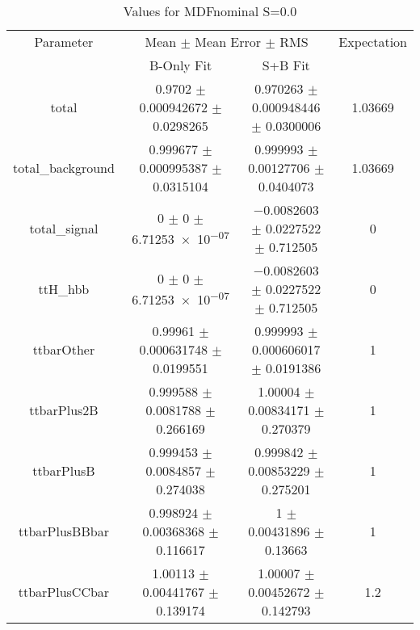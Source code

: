 \begin{table}
\centering
\caption{Values for MDFnominal S=0.0}
\begin{tabular}{cccc}
\toprule
Parameter & \multicolumn{2}{c}{Mean $\pm$ Mean Error $\pm$ RMS} & Expectation\\
 & B-Only Fit & S+B Fit & \\
\midrule
total & \num{0.9702} $\pm$ \num{0.000942672} $\pm$ \num{0.0298265} & \num{0.970263} $\pm$ \num{0.000948446} $\pm$ \num{0.0300006} & \num{1.03669}\\
total\_background & \num{0.999677} $\pm$ \num{0.000995387} $\pm$ \num{0.0315104} & \num{0.999993} $\pm$ \num{0.00127706} $\pm$ \num{0.0404073} & \num{1.03669}\\
total\_signal & \num{0} $\pm$ \num{0} $\pm$ \num{6.71253e-07} & \num{-0.0082603} $\pm$ \num{0.0227522} $\pm$ \num{0.712505} & \num{0}\\
ttH\_hbb & \num{0} $\pm$ \num{0} $\pm$ \num{6.71253e-07} & \num{-0.0082603} $\pm$ \num{0.0227522} $\pm$ \num{0.712505} & \num{0}\\
ttbarOther & \num{0.99961} $\pm$ \num{0.000631748} $\pm$ \num{0.0199551} & \num{0.999993} $\pm$ \num{0.000606017} $\pm$ \num{0.0191386} & \num{1}\\
ttbarPlus2B & \num{0.999588} $\pm$ \num{0.0081788} $\pm$ \num{0.266169} & \num{1.00004} $\pm$ \num{0.00834171} $\pm$ \num{0.270379} & \num{1}\\
ttbarPlusB & \num{0.999453} $\pm$ \num{0.0084857} $\pm$ \num{0.274038} & \num{0.999842} $\pm$ \num{0.00853229} $\pm$ \num{0.275201} & \num{1}\\
ttbarPlusBBbar & \num{0.998924} $\pm$ \num{0.00368368} $\pm$ \num{0.116617} & \num{1} $\pm$ \num{0.00431896} $\pm$ \num{0.13663} & \num{1}\\
ttbarPlusCCbar & \num{1.00113} $\pm$ \num{0.00441767} $\pm$ \num{0.139174} & \num{1.00007} $\pm$ \num{0.00452672} $\pm$ \num{0.142793} & \num{1.2}\\
\bottomrule
\end{tabular}
\end{table}